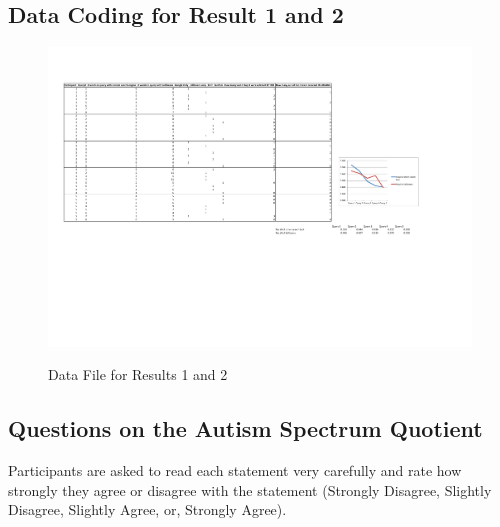 \documentclass[a4paper, 11pt]{article}
\begin{document}
\newpage
\subsection{Data Coding for Result 1 and 2}\label{datacoding}

\begin{figure}[H]
\includegraphics[angle=90, scale=0.57]{resultsCoding}\\
\caption{Data File for Results 1 and 2}

\end{figure}




\newpage
\subsection{Questions on the Autism Spectrum Quotient \cite{Baron Cohen et al}} \label{AQ}

Participants are asked to read each statement very carefully and rate how strongly they agree or disagree with the statement (Strongly Disagree, Slightly Disagree, Slightly Agree, or, Strongly Agree).  \\
\hspace{1cm}
\end{document}

